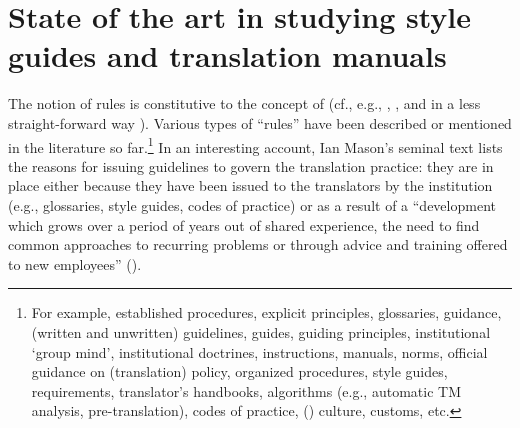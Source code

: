 \documentclass[output=paper]{langsci/langscibook}
\begin{document}
\section{State of the art in studying style guides and translation manuals}\label{sec:svoboda:2}

The notion of rules is constitutive to the concept of  (cf., e.g., \citealt[18]{Koskinen2008}, \citealt[343]{Halverson2008}, \citealt[142]{Kang2009} and in a less straight-forward way \citealt[159]{Becker-Mrotzek1990}). Various types of “rules” have been described or mentioned in the literature so far.\footnote{For example, established procedures, explicit principles, glossaries, guidance, (written and unwritten) guidelines, guides, guiding principles, institutional ‘group mind’, institutional doctrines, instructions, manuals, norms, official guidance on (translation) policy, organized procedures, style guides,  requirements, translator’s handbooks, algorithms (e.g., automatic TM analysis, pre-translation), codes of practice, () culture, customs, etc.} In an interesting account, Ian Mason’s seminal text \citep{Mason2004[2003]} lists the reasons for issuing guidelines to govern the translation practice: they are in place either because they have been issued to the translators by the institution (e.g., glossaries, style guides, codes of practice) or as a result of a “development which grows over a period of years out of shared experience, the need to find common approaches to recurring problems or through advice and training offered to new employees” (\citeyear[470]{Mason2004[2003]}). 
\end{document}
